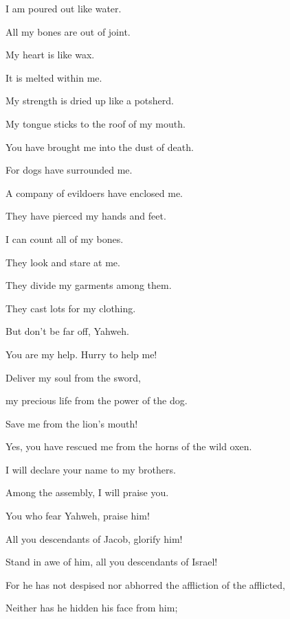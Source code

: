 {\par }{\Q {}I am poured out like water.
\par }{\QB All my bones are out of joint.
\par }{\Q My heart is like wax.
\par }{\QB It is melted within me.
\par }{\Q {}My strength is dried up like a potsherd.
\par }{\QB My tongue sticks to the roof of my mouth.
\par }{\Q You have brought me into the dust of death.
\par }{\Q {}For dogs have surrounded me.
\par }{\QB A company of evildoers have enclosed me.
\par }{\QB They have pierced my hands and feet.
\par }{\Q {}I can count all of my bones.
\par }{\Q They look and stare at me.
\par }{\Q {}They divide my garments among them.
\par }{\QB They cast lots for my clothing.
\par }{\BB \par }{\Q {}But don’t be far off, Yahweh.
\par }{\QB You are my help. Hurry to help me!
\par }{\Q {}Deliver my soul from the sword,
\par }{\QB my precious life from the power of the dog.
\par }{\Q {}Save me from the lion’s mouth!
\par }{\QB Yes, you have rescued me from the horns of the wild oxen.
\par }{\BB \par }{\Q {}I will declare your name to my brothers.
\par }{\QB Among the assembly, I will praise you.
\par }{\Q {}You who fear Yahweh, praise him!
\par }{\QB All you descendants of Jacob, glorify him!
\par }{\QB Stand in awe of him, all you descendants of Israel!
\par }{\Q {}For he has not despised nor abhorred the affliction of the afflicted,
\par }{\QB Neither has he hidden his face from him;
}

